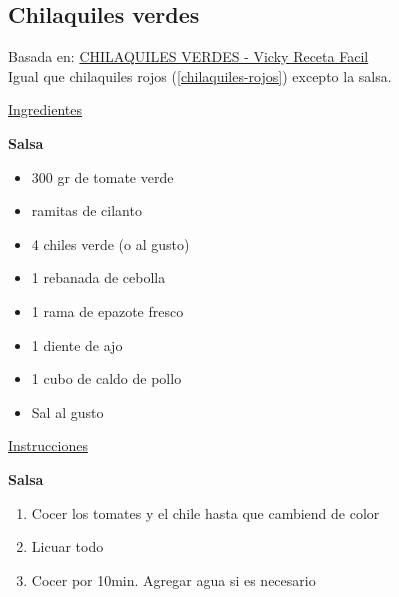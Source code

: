 \subsection{Chilaquiles verdes}\label{chilaquiles-verdes}

Basada en: \href{https://www.youtube.com/watch?v=CcuHrqMZOFU}{CHILAQUILES VERDES - Vicky Receta Facil} \\

Igual que chilaquiles rojos (\ref{chilaquiles-rojos})  excepto la salsa.

\underline{Ingredientes}

\textbf{Salsa}
\begin{itemize}
\item 300 gr de tomate verde
\item {} ramitas de cilanto
\item 4 chiles verde (o al gusto)
\item 1 rebanada de cebolla
\item 1 rama de epazote fresco
\item 1 diente de ajo
\item 1 cubo de caldo de pollo
\item Sal al gusto
\end{itemize}


\underline{Instrucciones}

\textbf{Salsa}
\begin{enumerate}
\item Cocer los tomates y el chile hasta que cambiend de color
\item Licuar todo
\item Cocer por \Sim 10min. Agregar agua si es necesario
\end{enumerate}

